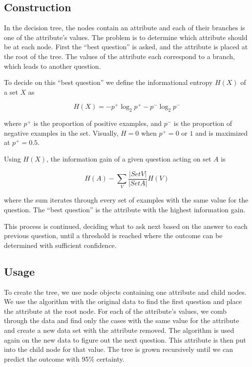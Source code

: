 \documentclass[11pt,a4paper]{article}
\begin{document}
\subsection{Construction}
\label{DecisionTrees:Construction}

In the decision tree, the nodes contain an attribute and each of their branches is one of the attribute's values. The problem is to determine which attribute should be at each node. First the ``best question'' is asked, and the attribute is placed at the root of the tree. The values of the attribute each correspond to a branch, which leads to another question.

To decide on this ``best question'' we define the informational entropy $H(X)$ of a set $X$ as 

\[
H(X) = -p^+ \log_2{p^+} - p^- \log_2{p^-}
\]

where $p^+$ is the proportion of positive examples, and $p^-$ is the proportion of negative examples in the set. Visually, $H = 0$ when $p^+ = 0$ or $1$ and is maximized at $p^+ = 0.5$.

Using $H(X)$, the information gain of a given question acting on set $A$ is

\[
H(A) - \sum_V{\frac{|Set V|}{|Set A|}H(V)}
\]

where the sum iterates through every set of examples with the same value for the question. The ``best question'' is the attribute with the highest information gain.

This process is continued, deciding what to ask next based on the answer to each previous question, until a threshold is reached where the outcome can be determined with sufficient confidence.

\subsection{Usage} 
\label{DecisionTrees:Usage}

To create the tree, we use node objects containing one attribute and child nodes. We use the algorithm with the original data to find the first question and place the attribute at the root node. For each of the attribute's values, we comb through the data and find only the cases with the same value for the attribute and create a new data set with the attribute removed. The algorithm is used again on the new data to figure out the next question. This attribute is then put into the child node for that value. The tree is grown recursively until we can predict the outcome with 95\% certainty.
\end{document}
